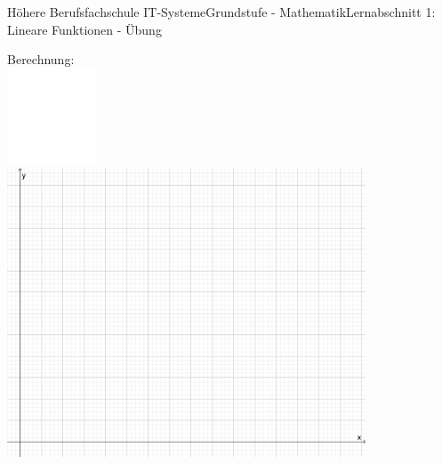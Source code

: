 \documentclass[oneside,openany,headings=optiontotoc,11pt,numbers=noenddot]{scrreprt}
\begin{document}
\begin{worksheet}{Höhere Berufsfachschule IT-Systeme}{Grundstufe - Mathematik}{Lernabschnitt 1: Lineare Funktionen - Übung}
		\begin{framed}
			\noindent
			\small{\color{codegray}Berechnung:}\\
			\includegraphics[width=0.2\textwidth]{../../empty.jpg}\\
			\includegraphics[width=0.8\textwidth]{../99_Bilder/KoordLeer.png}
		\end{framed}
	\end{worksheet}
\end{document}
